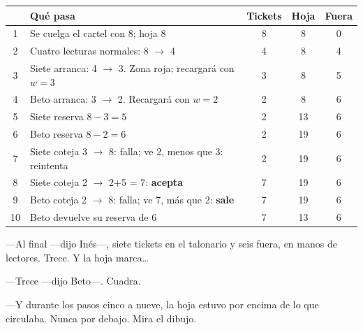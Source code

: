 \begin{pizarra}
\begin{tabular}{@{}c p{5.1cm} c c c@{}}
\toprule
& \textbf{Qué pasa} & \textbf{Tickets} & \textbf{Hoja} & \textbf{Fuera} \\
\midrule
1 & Se cuelga el cartel con 8; hoja 8 & 8 & 8 & 0 \\
2 & Cuatro lecturas normales: 8 $\to$ 4 & 4 & 8 & 4 \\
3 & Siete arranca: 4 $\to$ 3. Zona roja; recargará con $w=3$ & 3 & 8 & 5 \\
4 & Beto arranca: 3 $\to$ 2. Recargará con $w=2$ & 2 & 8 & 6 \\
5 & Siete reserva $8-3=5$ & 2 & 13 & 6 \\
6 & Beto reserva $8-2=6$ & 2 & 19 & 6 \\
7 & Siete coteja 3 $\to$ 8: falla; ve 2, menos que 3: reintenta & 2 & 19 & 6 \\
8 & Siete coteja 2 $\to$ 2+5 = 7: \textbf{acepta} & 7 & 19 & 6 \\
9 & Beto coteja 2 $\to$ 8: falla; ve 7, más que 2: \textbf{sale} & 7 & 19 & 6 \\
10 & Beto devuelve su reserva de 6 & 7 & 13 & 6 \\
\bottomrule
\end{tabular}
\end{pizarra}

---Al final ---dijo Inés---\nobreak, siete tickets en el talonario y seis fuera, en manos de lectores. Trece. Y la hoja marca\ldots

---Trece ---dijo Beto---\nobreak. Cuadra.

---Y durante los pasos cinco a nueve, la hoja estuvo por encima de lo que circulaba. Nunca por debajo. Mira el dibujo.

\begin{center}
\end{center}

